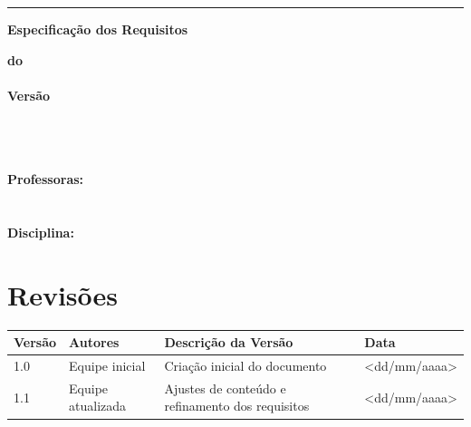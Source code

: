 \documentclass[12pt,a4paper]{article}
\begin{document}
\begin{titlepage}

\noindent\rule{\textwidth}{0.8pt} %

\begin{flushright}
    {\Huge \textbf{Especificação dos Requisitos}}
\end{flushright}

\begin{flushright}
    {\Large \textbf{do}}\\[1.0cm]
    
    {\Huge \textbf{\ProjetoNome}}\\[1.2cm]
    
    {\Large \textbf{Versão \VersaoDocumento}}
\end{flushright}

\vspace{1.8cm}
\begin{flushleft}
    \AutorA\\
    \AutorB\\
    \AutorC\\[0.5cm]

    \textbf{Professoras:} \\
        \ProfessoraA\\
        \ProfessoraB\\[0.5cm]
    \textbf{Disciplina:} \DisciplinaNome
\end{flushleft}

\end{titlepage}

\tableofcontents
\newpage




\section*{Revisões}
\begin{longtable}{|p{2.5cm}|p{4cm}|p{5cm}|p{3cm}|}
\hline
\textbf{Versão} & \textbf{Autores} & \textbf{Descrição da Versão} & \textbf{Data} \\
\hline
1.0 & Equipe inicial & Criação inicial do documento & \textless dd/mm/aaaa\textgreater \\
\hline
1.1 & Equipe atualizada & Ajustes de conteúdo e refinamento dos requisitos & \textless dd/mm/aaaa\textgreater \\
\hline
\end{longtable}
\end{document}
